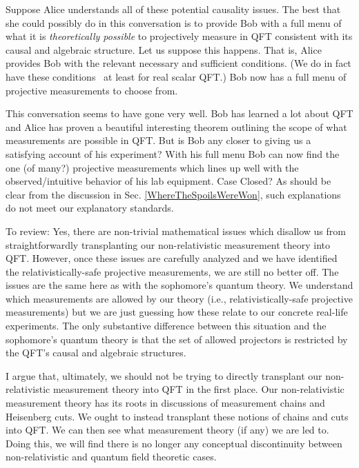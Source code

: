 \documentclass[12pt,prd,superscriptaddress,floatfix,amsmath,amssymb,amsfonts,nofootinbib]{revtex4-2}
\begin{document}
Suppose Alice understands all of these potential causality issues. The best that she could possibly do in this conversation is to provide Bob with a full menu of what it is \textit{theoretically possible} to projectively measure in QFT consistent with its causal and algebraic structure. Let us suppose this happens. That is, Alice provides Bob with the relevant necessary and sufficient conditions. (We do in fact have these conditions~\cite{Jubb2022,BorstenJubbKells} at least for real scalar QFT.) Bob now has a full menu of projective measurements to choose from.

This conversation seems to have gone very well. Bob has learned a lot about QFT and Alice has proven a beautiful interesting theorem outlining the scope of what measurements are possible in QFT. But is Bob any closer to giving us a satisfying account of his experiment? With his full menu Bob can now find the one (of many?) projective measurements which lines up well with the observed/intuitive behavior of his lab equipment. Case Closed? As should be clear from the discussion in Sec. \ref{WhereTheSpoilsWereWon}, such explanations do not meet our explanatory standards. 

To review: Yes, there are non-trivial mathematical issues which disallow us from straightforwardly transplanting our non-relativistic measurement theory into QFT. However, once these issues are carefully analyzed and we have identified the relativistically-safe projective measurements, we are still no better off. The issues are the same here as with the sophomore's quantum theory. We understand which measurements are allowed by our theory (i.e., relativistically-safe projective measurements) but we are just guessing how these relate to our concrete real-life experiments. The only substantive difference between this situation and the sophomore's quantum theory is that the set of allowed projectors is restricted by the QFT's causal and algebraic structures.

I argue that, ultimately, we should not be trying to directly transplant our non-relativistic measurement theory into QFT in the first place. Our non-relativistic measurement theory has its roots in discussions of measurement chains and Heisenberg cuts. We ought to instead transplant these notions of chains and cuts into QFT. We can then see what measurement theory (if any) we are led to. Doing this, we will find there is no longer any conceptual discontinuity between non-relativistic and quantum field theoretic cases. %
\end{document}
